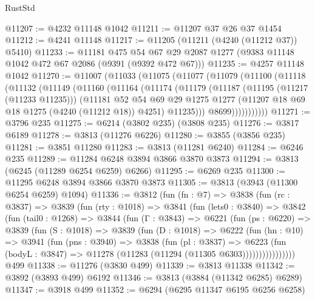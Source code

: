 \begin{lexlean}{RustStd}
\begin{coremodule}
@11207 := @4232 @11148 @1042
@11211 := @11207 @37 @26 @37 @1454
@11212 := @4241 @11148
@11217 := @11205 (@11211 (@4240 (@11212 @37)) @5410)
@11233 := @11181
    @475
    @54
    @67
    @29
    @2087
    @1277
    (@9383 @11148 @1042 @472 @67 @2086 (@9391 (@9392 @472 @67)))
@11235 := @4257 @11148 @1042
@11270 := @11007
    (@11033
      (@11075
        (@11077
          (@11079
            (@11100
              (@11118
                (@11132
                  (@11149
                    (@11160
                      (@11164
                        (@11174
                          (@11179
                            (@11187
                              (@11195 (@11217 (@11233 @11235)))
                              (@11181
                                @52
                                @54
                                @69
                                @29
                                @1275
                                @1277
                                (@11207 @18 @69 @18 @1275 (@4240 (@11212 @18)) @4251)
                                @11235)))
                          @8699)))))))))))
@11271 := @3796 @235
@11275 := @6214 (@3802 @235) (@3808 @235)
@11276 := @3817 @6189
@11278 := @3813 (@11276 @6226)
@11280 := @3855 (@3856 @235)
@11281 := @3851 @11280
@11283 := @3813 (@11281 @6240)
@11284 := @6246 @235
@11289 := @11284 @6248 @3894 @3866 @3870 @3873
@11294 := @3813 (@6245 (@11289 @6254 @6259) @6266)
@11295 := @6269 @235
@11300 := @11295 @6248 @3894 @3866 @3870 @3873
@11305 := @3813 (@3943 (@11300 @6254 @6259) @1094)
@11336 := @3812
    (fun (fn : @7) =>
    @3838
      (fun (rc : @3837) =>
      @3839
        (fun (rty : @1018) =>
        @3841
          (fun (lets0 : @3840) =>
          @3842
            (fun (tail0 : @1268) =>
            @3844
              (fun (Γ : @3843) =>
              @6221
                (fun (ps : @6220) =>
                @3839
                  (fun (S : @1018) =>
                  @3839
                    (fun (D : @1018) =>
                    @6222
                      (fun (hn : @10) =>
                      @3941
                        (fun (pns : @3940) =>
                        @3838
                          (fun (pl : @3837) =>
                          @6223
                            (fun (bodyL : @3847) =>
                            @11278 (@11283 (@11294 (@11305 @6303))))))))))))))))
    @499
@11338 := @11276 (@3830 @499)
@11339 := @3813 @11338
@11342 := @3892 (@3893 @499) @6192
@11346 := @3813 (@3884 (@11342 @6285) @6289)
@11347 := @3918 @499
@11352 := @6294 (@6295 @11347 @6195 @6256 @6258)

\end{coremodule}
\end{lexlean}
